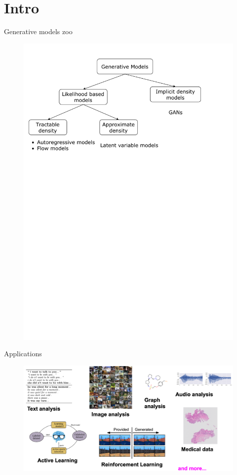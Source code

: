 \section{Intro}
\begin{frame}{Generative models zoo}
    \begin{figure}
        \centering
        \includegraphics[width=1.0\linewidth]{figs/generative_models_zoo.pdf}
        \label{fig:generative_models_zoo}
    \end{figure}
\end{frame}
\begin{frame}{Applications}
	\begin{figure}
		\centering
		\includegraphics[width=\linewidth]{figs/applications}
	\end{figure}
\end{frame}

